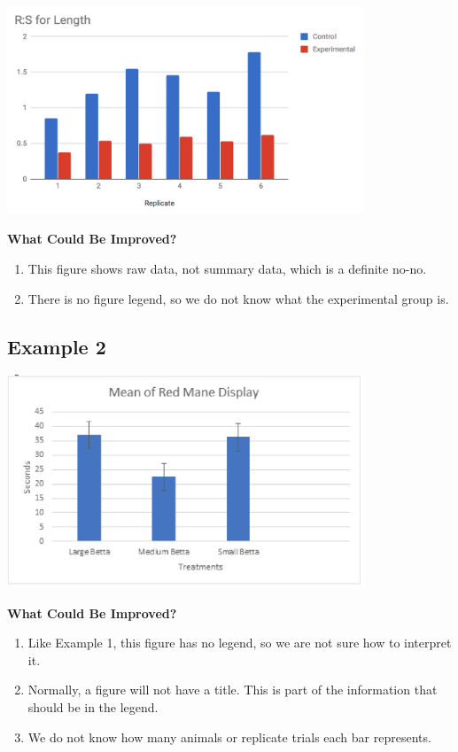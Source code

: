 \documentclass[
]{book}
\providecommand{\tightlist}{%
  \setlength{\itemsep}{0pt}\setlength{\parskip}{0pt}}
\begin{document}
\includegraphics[width=0.8\textwidth,height=\textheight]{images/Raw_data.png}

\textbf{What Could Be Improved?}

\begin{enumerate}
\def\labelenumi{\arabic{enumi}.}
\tightlist
\item
  This figure shows raw data, not summary data, which is a definite no-no.
\item
  There is no figure legend, so we do not know what the experimental group is.
\end{enumerate}

\hypertarget{example-2-10}{%
\subsection{Example 2}\label{example-2-10}}

\includegraphics[width=0.8\textwidth,height=\textheight]{images/Red-mane.png}

\textbf{What Could Be Improved?}

\begin{enumerate}
\def\labelenumi{\arabic{enumi}.}
\tightlist
\item
  Like Example 1, this figure has no legend, so we are not sure how to interpret it.
\item
  Normally, a figure will not have a title. This is part of the information that should be in the legend.
\item
  We do not know how many animals or replicate trials each bar represents.
\end{enumerate}
\end{document}
